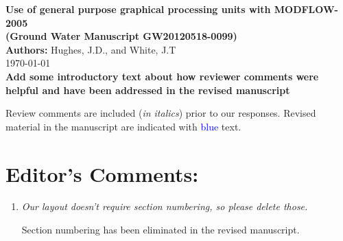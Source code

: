 \documentclass[12pt]{article} %
\begin{document}
\noindent
\textbf{Use of general purpose graphical processing units with MODFLOW-2005 \\ (Ground Water Manuscript GW20120518-0099) }\\

\noindent
\textbf{Authors:} Hughes, J.D., and White, J.T \\

\today \\

\noindent
\textbf{Add some introductory text about how reviewer comments were helpful and have been addressed in the revised manuscript} 

Review comments are included (\textit{in italics}) prior to our responses. Revised material in the manuscript are indicated with \textcolor{blue}{blue} text.

\section*{Editor's Comments:}
\begin{enumerate}
\item \textit{Our layout doesn't require section numbering, so please delete those.}

Section numbering has been eliminated in the revised manuscript.

\end{enumerate}
\end{document}
